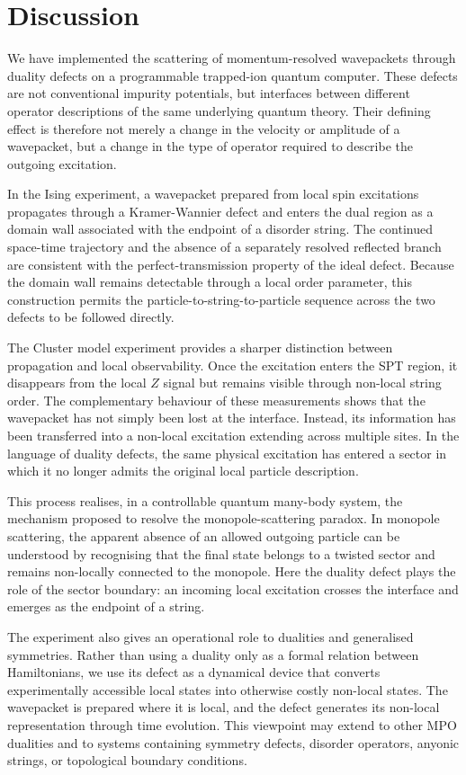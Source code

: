 \documentclass[aps,floatfix,10pt,amssymb,amsfont,amsmath,superscriptaddress,float,nofootinbib,longbibliography,nobalancelastpage,twocolumn]{revtex4-2}
\begin{document}
\section{Discussion}

We have implemented the scattering of momentum-resolved wavepackets through duality defects on a programmable trapped-ion quantum computer. These defects are not conventional impurity potentials, but interfaces between different operator descriptions of the same underlying quantum theory. Their defining effect is therefore not merely a change in the velocity or amplitude of a wavepacket, but a change in the type of operator required to describe the outgoing excitation.

In the Ising experiment, a wavepacket prepared from local spin excitations propagates through a Kramer-Wannier defect and enters the dual region as a domain wall associated with the endpoint of a disorder string. The continued space-time trajectory and the absence of a separately resolved reflected branch are consistent with the perfect-transmission property of the ideal defect. Because the domain wall remains detectable through a local order parameter, this construction permits the particle-to-string-to-particle sequence across the two defects to be followed directly.

The Cluster model experiment provides a sharper distinction between propagation and local observability. Once the excitation enters the SPT region, it disappears from the local $Z$ signal but remains visible through non-local string order. The complementary behaviour of these measurements shows that the wavepacket has not simply been lost at the interface. Instead, its information has been transferred into a non-local excitation extending across multiple sites. In the language of duality defects, the same physical excitation has entered a sector in which it no longer admits the original local particle description.

This process realises, in a controllable quantum many-body system, the mechanism proposed to resolve the monopole-scattering paradox. In monopole scattering, the apparent absence of an allowed outgoing particle can be understood by recognising that the final state belongs to a twisted sector and remains non-locally connected to the monopole. Here the duality defect plays the role of the sector boundary: an incoming local excitation crosses the interface and emerges as the endpoint of a string. 

The experiment also gives an operational role to dualities and generalised symmetries. Rather than using a duality only as a formal relation between Hamiltonians, we use its defect as a dynamical device that converts experimentally accessible local states into otherwise costly non-local states. The wavepacket is prepared where it is local, and the defect generates its non-local representation through time evolution. This viewpoint may extend to other MPO dualities and to systems containing symmetry defects, disorder operators, anyonic strings, or topological boundary conditions.
\end{document}
